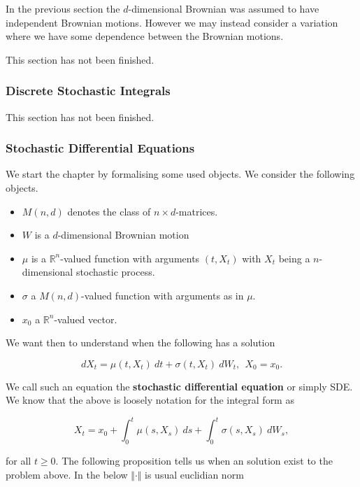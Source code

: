 \documentclass[
]{article}
\providecommand{\tightlist}{%
  \setlength{\itemsep}{0pt}\setlength{\parskip}{0pt}}
\begin{document}
In the previous section the \(d\)-dimensional Brownian was assumed to
have independent Brownian motions. However we may instead consider a
variation where we have some dependence between the Brownian motions.

This section has not been finished.

\hypertarget{discrete-stochastic-integrals}{%
\subsubsection{Discrete Stochastic
Integrals}\label{discrete-stochastic-integrals}}

This section has not been finished.

\hypertarget{stochastic-differential-equations}{%
\subsubsection{Stochastic Differential
Equations}\label{stochastic-differential-equations}}

We start the chapter by formalising some used objects. We consider the
following objects.

\begin{itemize}
\tightlist
\item
  \(M(n,d)\) denotes the class of \(n\times d\)-matrices.
\item
  \(W\) is a \(d\)-dimensional Brownian motion
\item
  \(\mu\) is a \(\mathbb{R}^n\)-valued function with arguments
  \((t,X_t)\) with \(X_t\) being a \(n\)-dimensional stochastic process.
\item
  \(\sigma\) a \(M(n,d)\)-valued function with arguments as in \(\mu\).
\item
  \(x_0\) a \(\mathbb{R}^n\)-valued vector.
\end{itemize}

We want then to understand when the following has a solution

\[
dX_t=\mu(t,X_t)\ dt + \sigma(t,X_t)\ dW_t,\ \ X_0=x_0.
\]

We call such an equation the \textbf{stochastic differential equation}
or simply SDE. We know that the above is loosely notation for the
integral form as

\[
X_t=x_0+\int_0^t\mu(s,X_s)\ ds +\int_0^t\sigma(s,X_s)\ dW_s,
\]

for all \(t\ge 0\). The following proposition tells us when an solution
exist to the problem above. In the below \(\Vert \cdot \Vert\) is usual
euclidian norm
\end{document}
